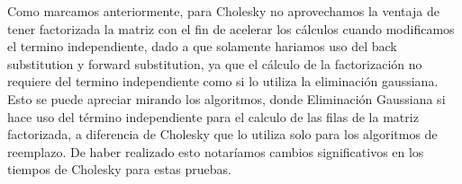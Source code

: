 Como marcamos anteriormente, para Cholesky no aprovechamos la ventaja de tener factorizada la matriz con el fin de acelerar los cálculos cuando modificamos el termino independiente, dado a que solamente hariamos uso del back substitution y forward substitution, ya que el cálculo de la factorización no requiere del termino independiente como si lo utiliza la eliminación gaussiana. Esto se puede apreciar mirando los algoritmos, donde Eliminación Gaussiana si hace uso del término independiente para el calculo de las filas de la matriz factorizada, a diferencia de Cholesky que lo utiliza solo para los algoritmos de reemplazo. De haber realizado esto notaríamos cambios significativos en los tiempos de Cholesky para estas pruebas.

